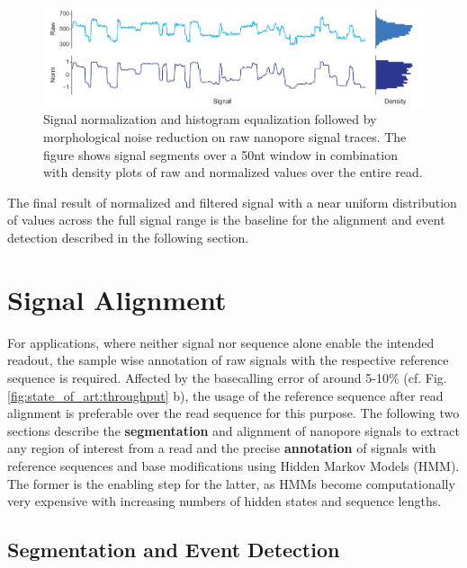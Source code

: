 \begin{figure}[h]
	\centering
	\includegraphics[width=1.0\textwidth]{figures/signal/normalization.pdf}
	\captionsetup{format=plain}
	\caption[Signal normalization and histogram equalization]{Signal normalization and histogram equalization followed by morphological noise reduction on raw nanopore signal traces. The figure shows signal segments over a 50nt window in combination with density plots of raw and normalized values over the entire read.}
	\label{fig:signal:normalization}
\end{figure}

The final result of normalized and filtered signal with a near uniform distribution of values across the full signal range is the baseline for the alignment and event detection described in the following section.




\section{Signal Alignment}
\label{sec:signal:alignment}

For applications, where neither signal nor sequence alone enable the intended readout, the sample wise annotation of raw signals with the respective reference sequence is required. Affected by the basecalling error of around 5-10\% (cf. Fig. \ref{fig:state_of_art:throughput} b), the usage of the reference sequence after read alignment is preferable over the read sequence for this purpose. The following two sections describe the \textbf{segmentation} and alignment of nanopore signals to extract any region of interest from a read and the precise \textbf{annotation} of signals with reference sequences and base modifications using Hidden Markov Models (HMM). The former is the enabling step for the latter, as HMMs become computationally very expensive with increasing numbers of hidden states and sequence lengths.




\subsection{Segmentation and Event Detection}
\label{subsec:signal:segmentation}

